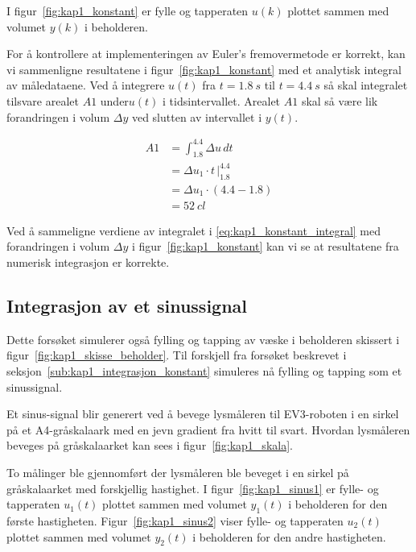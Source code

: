 \documentclass[main.tex]{subfiles}
\begin{document}
I figur~\ref{fig:kap1_konstant} er fylle og tapperaten $u(k)$ plottet sammen med volumet $y(k)$ i beholderen.



For å kontrollere at implementeringen av Euler's fremovermetode er korrekt, kan vi sammenligne resultatene i figur~\ref{fig:kap1_konstant} med et analytisk integral av måledataene. Ved å integrere $u(t)$ fra $t = \SI{1.8}{s}$ til $t = \SI{4.4}{s}$ så skal integralet tilsvare arealet $A1$ under$u(t)$ i tidsintervallet. Arealet $A1$ skal så være lik forandringen i volum $\Delta y$ ved slutten av intervallet i $y(t)$.

\begin{align}
    A1 & = \int_{1.8}^{4.4} \Delta u \, dt \nonumber         \\
       & = \Delta u_1 \cdot t \, \Big|_{1.8}^{4.4} \nonumber \\
       & = \Delta u_1 \cdot (4.4 - 1.8) \nonumber            \\
       & = \SI{52}{cl} \label{eq:kap1_konstant_integral}
\end{align}

Ved å sammeligne verdiene av integralet i \eqref{eq:kap1_konstant_integral} med forandringen i volum $\Delta y$ i figur~\ref{fig:kap1_konstant} kan vi se at resultatene fra numerisk integrasjon er korrekte.

\subsection{Integrasjon av et sinussignal}

Dette forsøket simulerer også fylling og tapping av væske i beholderen skissert i figur~\ref{fig:kap1_skisse_beholder}. Til forskjell fra forsøket beskrevet i seksjon~\ref{sub:kap1_integrasjon_konstant} simuleres nå fylling og tapping som et sinussignal.

Et sinus-signal blir generert ved å bevege lysmåleren til \textsc{EV3}-roboten i en sirkel på et A4-gråskalaark med en jevn gradient fra hvitt til svart. Hvordan lysmåleren beveges på gråskalaarket kan sees i figur~\ref{fig:kap1_skala}.



To målinger ble gjennomført der lysmåleren ble beveget i en sirkel på gråskalaarket med forskjellig hastighet. I figur~\ref{fig:kap1_sinus1} er fylle- og tapperaten $u_1(t)$ plottet sammen med volumet $y_1(t)$ i beholderen for den første hastigheten. Figur~\ref{fig:kap1_sinus2} viser fylle- og tapperaten $u_2(t)$ plottet sammen med volumet $y_2(t)$ i beholderen for den andre hastigheten.
\end{document}
